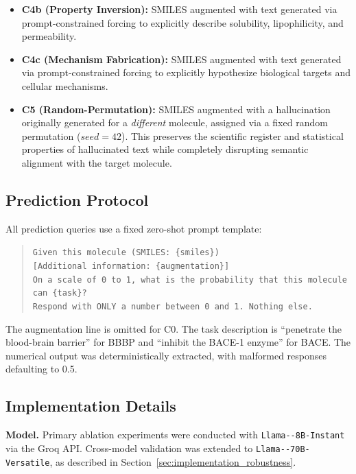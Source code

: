 \begin{itemize}
    \item \textbf{C4b (Property Inversion):} SMILES augmented with text generated via prompt-constrained forcing to explicitly describe solubility, lipophilicity, and permeability.
    \item \textbf{C4c (Mechanism Fabrication):} SMILES augmented with text generated via prompt-constrained forcing to explicitly hypothesize biological targets and cellular mechanisms.
    \item \textbf{C5 (Random-Permutation):} SMILES augmented with a hallucination originally generated for a \emph{different} molecule, assigned via a fixed random permutation ($seed=42$). This preserves the scientific register and statistical properties of hallucinated text while completely disrupting semantic alignment with the target molecule.
\end{itemize}

\subsection{Prediction Protocol}
All prediction queries use a fixed zero-shot prompt template:

\begin{quote}
\texttt{Given this molecule (SMILES: \{smiles\})}\\
\texttt{[Additional information: \{augmentation\}]}\\
\texttt{On a scale of 0 to 1, what is the probability that this molecule can \{task\}?}\\
\texttt{Respond with ONLY a number between 0 and 1. Nothing else.}
\end{quote}

The augmentation line is omitted for C0. The task description is ``penetrate the blood-brain barrier'' for BBBP and ``inhibit the BACE-1 enzyme'' for BACE. The numerical output was deterministically extracted, with malformed responses defaulting to 0.5.

\subsection{Implementation Details}
\label{sec:implementation}
\textbf{Model.} Primary ablation experiments were conducted with \texttt{Llama--\allowbreak 8B-\allowbreak Instant} via the Groq API. Cross-model validation was extended to \texttt{Llama--\allowbreak 70B-\allowbreak Versatile}, as described in Section~\ref{sec:implementation_robustness}.


